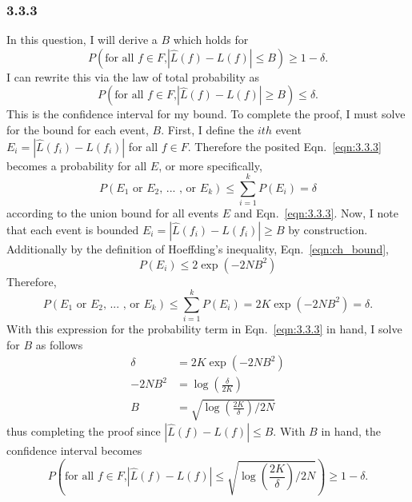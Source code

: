 \documentclass[12pt]{amsart}
\begin{document}
\subsubsection*{3.3.3}

In this question, I will derive a $B$ which holds for
\begin{equation}
P(\text{for all $f \in F$,} |\hat{L}(f) - L(f)| \leq B) \geq 1 - \delta.
\end{equation}
I can rewrite this via the law of total probability as
\begin{equation} \label{eqn:3.3.3}
P(\text{for all $f \in F$,} |\hat{L}(f) - L(f)| \geq B) \leq \delta.
\end{equation}
This is the confidence interval for my bound.  To complete the proof, I must solve for the bound for each event, $B$.  First, I define the $ith$ event $E_i = |\hat{L}(f_i) - L(f_i)|$ for all $f \in F$.  Therefore the posited Eqn.~\ref{eqn:3.3.3} becomes a probability for all $E$, or more specifically,
\begin{equation}
P(E_1 \text{ or } E_2 \text{, ... , or } E_k) \leq \sum_{i = 1}^k P(E_i) = \delta
\end{equation}
according to the union bound for all events $E$ and Eqn.~\ref{eqn:3.3.3}.  Now, I note that each event is bounded $E_i = |\hat{L}(f_i) - L(f_i)| \geq B$ by construction.  
Additionally by the definition of Hoeffding's inequality, Eqn.~\ref{eqn:ch_bound},
\begin{equation}
P(E_i) \leq 2\exp(-2NB^2)
\end{equation}
Therefore, 
\begin{equation}
P(E_1 \text{ or } E_2 \text{, ... , or } E_k) \leq \sum_{i = 1}^k P(E_i) = 2K \exp(-2NB^2) = \delta.
\end{equation}
With this expression for the probability term in Eqn.~\ref{eqn:3.3.3} in hand, I solve for $B$ as follows
\begin{equation} \label{eqn:b}
\begin{split}
\delta & = 2K \exp(-2NB^2) \\
-2NB^2 & = \log(\frac{\delta}{2K}) \\
B & = \sqrt{\log(\frac{2K}{\delta})/2N}
\end{split}
\end{equation}
thus completing the proof since $|\hat{L}(f) - L(f)| \leq B$.  With $B$ in hand, the confidence interval becomes
\begin{equation}
P(\text{for all $f \in F$,} |\hat{L}(f) - L(f)| \leq \sqrt{\log(\frac{2K}{\delta})/2N}) \geq 1 - \delta.
\end{equation}
\end{document}
